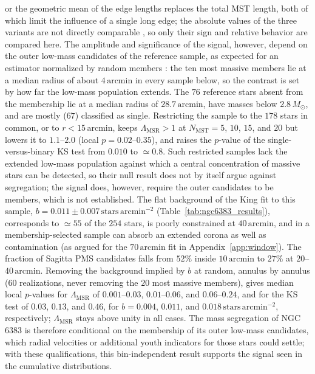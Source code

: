 \documentclass{aa}
\begin{document}
\citep{2011MNRAS.416..541M} or the geometric mean of the edge lengths \citep{2011A&A...532A.119O} replaces the total MST length, both of which limit the influence of a single long edge; the absolute values of the three variants are not directly comparable \citep{2011MNRAS.416..541M}, so only their sign and relative behavior are compared here. The amplitude and significance of the signal, however, depend on the outer low-mass candidates of the reference sample, as expected for an estimator normalized by random members \citep{2015MNRAS.449.3381P}: the ten most massive members lie at a median radius of about $4\,\mathrm{arcmin}$ in every sample below, so the contrast is set by how far the low-mass population extends. The $76$ reference stars absent from the \citet{2024arXiv240305143H} membership lie at a median radius of $28.7\,\mathrm{arcmin}$, have masses below $2.8\,M_\odot$, and are mostly ($67$) classified as single. Restricting the sample to the $178$ stars in common, or to $r<15\,\mathrm{arcmin}$, keeps $\Lambda_{\mathrm{MSR}}>1$ at $N_{\mathrm{MST}}=5$, $10$, $15$, and $20$ but lowers it to $1.1$--$2.0$ (local $p=0.02$--$0.35$), and raises the $p$-value of the single-versus-binary KS test from $0.010$ to $\simeq0.8$. Such restricted samples lack the extended low-mass population against which a central concentration of massive stars can be detected, so their null result does not by itself argue against segregation; the signal does, however, require the outer candidates to be members, which is not established. The flat background of the King fit to this sample, $b=0.011\pm0.007\,\mathrm{stars\,arcmin^{-2}}$ (Table~\ref{tab:ngc6383_results}), corresponds to $\simeq55$ of the $254$ stars, is poorly constrained at $40\,\mathrm{arcmin}$, and in a membership-selected sample can absorb an extended corona as well as contamination (as argued for the $70\,\mathrm{arcmin}$ fit in Appendix~\ref{app:window}). The fraction of Sagitta PMS candidates falls from $52\%$ inside $10\,\mathrm{arcmin}$ to $27\%$ at $20$--$40\,\mathrm{arcmin}$. Removing the background implied by $b$ at random, annulus by annulus ($60$ realizations, never removing the $20$ most massive members), gives median local $p$-values for $\Lambda_{\mathrm{MSR}}$ of $0.001$--$0.03$, $0.01$--$0.06$, and $0.06$--$0.24$, and for the KS test of $0.03$, $0.13$, and $0.46$, for $b=0.004$, $0.011$, and $0.018\,\mathrm{stars\,arcmin^{-2}}$, respectively; $\Lambda_{\mathrm{MSR}}$ stays above unity in all cases. The mass segregation of NGC 6383 is therefore conditional on the membership of its outer low-mass candidates, which radial velocities or additional youth indicators for those stars could settle; with these qualifications, this bin-independent result supports the signal seen in the cumulative distributions.
\end{document}
